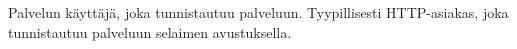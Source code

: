 Palvelun käyttäjä, joka tunnistautuu palveluun. Tyypillisesti HTTP-asiakas, joka tunnistautuu palveluun selaimen avustuksella.